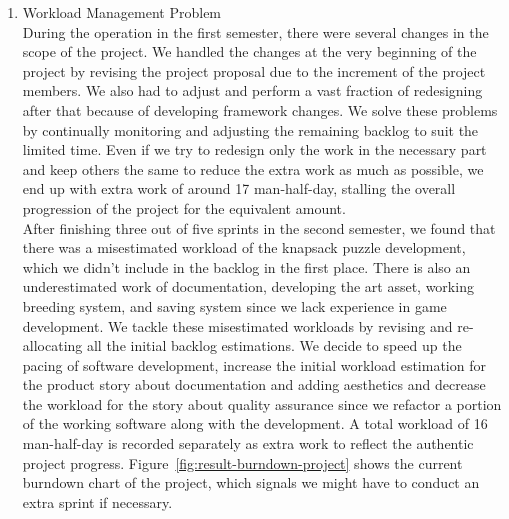 \documentclass[12pt,oneside,openright,a4paper]{cpe-english-project}
\begin{document}
\begin{enumerate}
	\item Workload Management Problem \\
	During the operation in the first semester, there were several changes in the scope of the project. We handled the changes at the very beginning of the project by revising the project proposal due to the increment of the project members. We also had to adjust and perform a vast fraction of redesigning after that because of developing framework changes. We solve these problems by continually monitoring and adjusting the remaining backlog to suit the limited time. Even if we try to redesign only the work in the necessary part and keep others the same to reduce the extra work as much as possible, we end up with extra work of around 17 man-half-day, stalling the overall progression of the project for the equivalent amount. \\
	After finishing three out of five sprints in the second semester, we found that there was a misestimated workload of the knapsack puzzle development, which we didn't include in the backlog in the first place. There is also an underestimated work of documentation, developing the art asset, working breeding system, and saving system since we lack experience in game development. We tackle these misestimated workloads by revising and re-allocating all the initial backlog estimations. We decide to speed up the pacing of software development, increase the initial workload estimation for the product story about documentation and adding aesthetics and decrease the workload for the story about quality assurance since we refactor a portion of the working software along with the development. A total workload of 16 man-half-day is recorded separately as extra work to reflect the authentic project progress. Figure~\ref{fig:result-burndown-project} shows the current burndown chart of the project, which signals we might have to conduct an extra sprint if necessary. \\
	\begin{minipage}[c]{\textwidth}\centering
	\label{fig:result-burndown-project}
	\end{minipage}
\end{enumerate}
\end{document}
